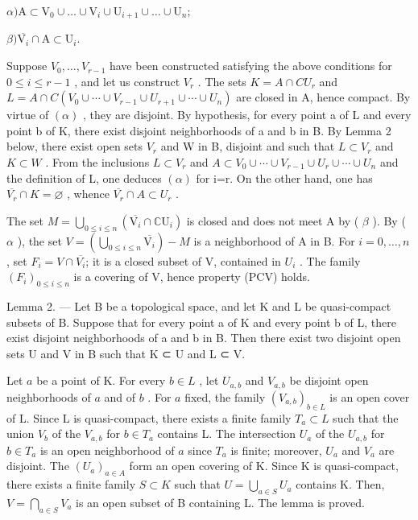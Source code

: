 \(\alpha)\mathrm{A}\subset \mathrm{V}_{0}\cup \dots \cup \mathrm{V}_{i}\cup \mathrm{U}_{i + 1}\cup \dots \cup \mathrm{U}_{n};\)

\(\beta)\overline{\mathrm{V}_{i}}\cap \mathrm{A}\subset \mathrm{U}_{i}.\)

Suppose \(V_{0},\ldots,V_{r-1}\) have been constructed satisfying the above conditions for \(0\leqslant i\leqslant r-1\) , and let us construct \(V_{r}\) . The sets \(K=A\cap C U_{r}\) and \(L=A\cap C(V_{0}\cup\cdots\cup V_{r-1}\cup U_{r+1}\cup\cdots\cup U_{n})\) are closed in A, hence compact. By virtue of \((\alpha)\) , they are disjoint. By hypothesis, for every point a of L and every point b of K, there exist disjoint neighborhoods of a and b in B. By Lemma 2 below, there exist open sets \(V_{r}\) and W in B, disjoint and such that \(L\subset V_{r}\) and \(K\subset W\) . From the inclusions \(L\subset V_{r}\) and \(A\subset V_{0}\cup\cdots\cup V_{r-1}\cup U_{r}\cup\cdots\cup U_{n}\) and the definition of L, one deduces \((\alpha)\) for i=r. On the other hand, one has \(\overline{V_{r}}\cap K=\varnothing\) , whence \(\overline{V_{r}}\cap A\subset U_{r}\) .

The set \(M = \bigcup_{0 \leqslant i \leqslant n} (\overline{\mathrm{V}_{i}} \cap \mathbb{C}\mathrm{U}_{i})\) is closed and does not meet A by ( \(\beta\) ). By ( \(\alpha\) ), the set \(V = (\bigcup_{0 \leqslant i \leqslant n} \overline{\mathrm{V}_{i}}) - M\) is a neighborhood of A in B. For \(i = 0, \ldots, n\) , set \(F_{i} = V \cap \overline{V_{i}}\); it is a closed subset of V, contained in \(U_{i}\) . The family \((F_{i})_{0 \leqslant i \leqslant n}\) is a covering of V, hence property (PCV) holds.

Lemma 2. --- Let B be a topological space, and let K and L be quasi-compact subsets of B. Suppose that for every point a of K and every point b of L, there exist disjoint neighborhoods of a and b in B. Then there exist two disjoint open sets U and V in B such that K ⊂ U and L ⊂ V.

Let \(a\) be a point of K. For every \(b \in L\) , let \(U_{a,b}\) and \(V_{a,b}\) be disjoint open neighborhoods of \(a\) and of \(b\) . For \(a\) fixed, the family \((V_{a,b})_{b \in L}\) is an open cover of L. Since L is quasi-compact, there exists a finite family \(T_a \subset L\) such that the union \(V_b\) of the \(V_{a,b}\) for \(b \in T_a\) contains L. The intersection \(U_a\) of the \(U_{a,b}\) for \(b \in T_a\) is an open neighborhood of \(a\) since \(T_a\) is finite; moreover, \(U_a\) and \(V_a\) are disjoint. The \((U_a)_{a \in A}\) form an open covering of K. Since K is quasi-compact, there exists a finite family \(S \subset K\) such that \(U = \bigcup_{a \in S} U_a\) contains K. Then, \(V = \bigcap_{a \in S} V_a\) is an open subset of B containing L. The lemma is proved.

